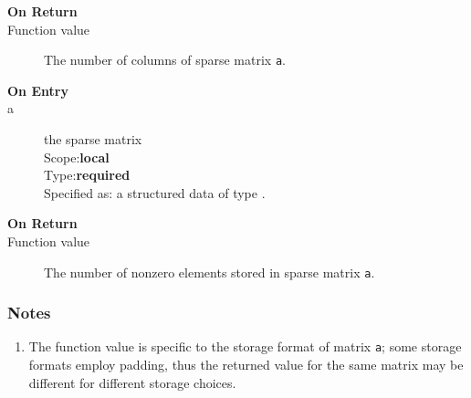 \begin{description}
\item[\bf On Return]
\item[Function value] The number of  columns  of sparse matrix \verb|a|.
\end{description}




\begin{description}
\item[\bf On Entry]
\item[a] the sparse matrix\\
Scope:{\bf local}\\
Type:{\bf required}\\
Specified as: a structured data of type \spdata.
\end{description}

\begin{description}
\item[\bf On Return]
\item[Function value] The number of nonzero elements stored in sparse matrix \verb|a|.
\end{description}

\subsubsection*{Notes}
\begin{enumerate}
\item The function value is specific to the storage format of matrix
  \verb|a|; some storage formats employ padding, thus the returned
  value for the same matrix may be different for different storage choices.
\end{enumerate}


